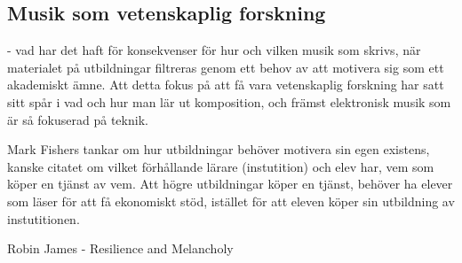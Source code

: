 \documentclass{article}
\begin{document}
\subsection{Musik som vetenskaplig forskning}
- vad har det haft för konsekvenser för hur och vilken musik som skrivs, när materialet på utbildningar filtreras
  genom ett behov av att motivera sig som ett akademiskt ämne. Att detta fokus på att få vara vetenskaplig
  forskning har satt sitt spår i vad och hur man lär ut komposition, och främst elektronisk musik som är så
  fokuserad på teknik. 

  Mark Fishers tankar om hur utbildningar behöver motivera sin egen existens, kanske citatet om vilket
  förhållande lärare (instutition) och elev har, vem som köper en tjänst av vem. Att högre utbildningar
  köper en tjänst, behöver ha elever som läser för att få ekonomiskt stöd, istället för att eleven köper sin
  utbildning av instutitionen. 

  Robin James - Resilience and Melancholy

	












\end{document}
